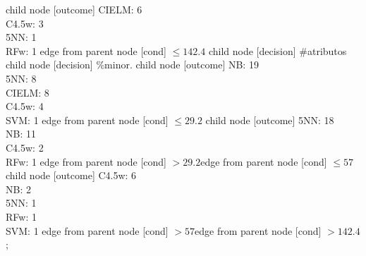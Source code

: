 child {node [outcome] {
CIELM: 6\\
C4.5w: 3\\
5NN: 1\\
RFw: 1} edge from parent node [cond] {$\leq142.4$}}
child {node [decision] {\#atributos}
child {node [decision] {\%minor.}
child {node [outcome] {
NB: 19\\
5NN: 8\\
CIELM: 8\\
C4.5w: 4\\
SVM: 1} edge from parent node [cond] {$\leq29.2$}}
child {node [outcome] {
5NN: 18\\
NB: 11\\
C4.5w: 2\\
RFw: 1} edge from parent node [cond] {$>29.2$}}edge from parent node [cond] {$\leq57$}}
child {node [outcome] {
C4.5w: 6\\
NB: 2\\
5NN: 1\\
RFw: 1\\
SVM: 1} edge from parent node [cond] {$>57$}}edge from parent node [cond] {$>142.4$}};